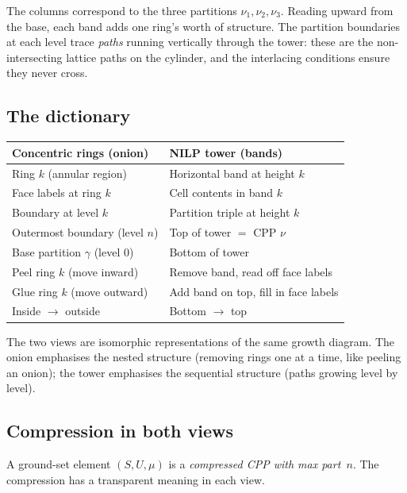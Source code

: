 \documentclass[11pt]{article}
\theoremstyle{plain}
\theoremstyle{definition}
\begin{document}
\noindent
The columns correspond to the three partitions
$\nu_1, \nu_2, \nu_3$.  Reading upward from the base, each
band adds one ring's worth of structure.  The partition
boundaries at each level trace \emph{paths} running vertically
through the tower: these are the non-intersecting lattice paths
on the cylinder, and the interlacing conditions ensure they
never cross.


\subsection{The dictionary}

\begin{center}
\renewcommand{\arraystretch}{1.4}
\begin{tabular}{l|l}
\textbf{Concentric rings (onion)}
  & \textbf{NILP tower (bands)}
\\ \hline
Ring $k$ (annular region)
  & Horizontal band at height $k$ \\
Face labels at ring $k$
  & Cell contents in band $k$ \\
Boundary at level $k$
  & Partition triple at height $k$ \\
Outermost boundary (level $n$)
  & Top of tower $=$ CPP $\nu$ \\
Base partition $\gamma$ (level $0$)
  & Bottom of tower \\
Peel ring $k$ (move inward)
  & Remove band, read off face labels \\
Glue ring $k$ (move outward)
  & Add band on top, fill in face labels \\
Inside $\to$ outside
  & Bottom $\to$ top
\end{tabular}
\end{center}

\noindent
The two views are isomorphic representations of the same
growth diagram.  The onion emphasises the nested structure
(removing rings one at a time, like peeling an onion); the
tower emphasises the sequential structure (paths growing
level by level).


\subsection{Compression in both views}

A ground-set element $(S, U, \mu)$ is a \emph{compressed CPP
with max part~$n$}.  The compression has a transparent meaning
in each view.
\end{document}
